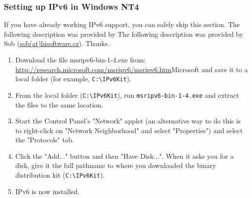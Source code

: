 \subsubsection{Setting up IPv6 in Windows NT4}
If you have already working IPv6 support, you can safely skip this
section.  The following description was provided by The following
description was provided by Sob
(\href{mailto:sob(at)hisoftware.cz}{sob(at)hisoftware.cz}). Thanks.

\begin{enumerate}
  \item Download the file msripv6-bin-1-4.exe from:
    \url{http://research.microsoft.com/msripv6/msripv6.htm}{Microsoft}
    and save it to a local folder (for example, \verb+C:\IPv6Kit+).
  \item From the local folder (\verb+C:\IPv6Kit+), run
    \verb+msripv6-bin-1-4.exe+ and extract the files to the same
    location.
  \item Start the Control Panel's "Network" applet (an alternative way to do this is
    to right-click on "Network Neighborhood" and select "Properties") and select
    the "Protocols" tab.
  \item Click the "Add..." button and then "Have Disk...". When it asks you for
    a disk, give it the full pathname to where you downloaded the binary
    distribution kit (\verb+C:\IPv6Kit+).
  \item IPv6 is now installed.
\end{enumerate}
